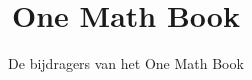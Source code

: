 \documentclass[11pt,a4paper,twoside,openany]{book}
\title{One Math Book}
\author{De bijdragers van het One Math Book}
\date{\bookdate}
\begin{document}
\frontmatter



\tableofcontents

\mainmatter



\appendix
\part{\omsolutionspart}


\backmatter
\printindex
\end{document}
